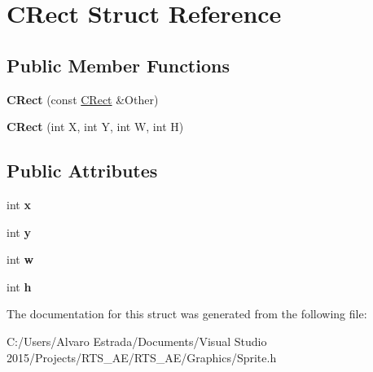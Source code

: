 \hypertarget{struct_c_rect}{}\section{C\+Rect Struct Reference}
\label{struct_c_rect}
\subsection*{Public Member Functions}
\begin{DoxyCompactItemize}
\item 
{\bfseries C\+Rect} (const \hyperlink{struct_c_rect}{C\+Rect} \&Other)\hypertarget{struct_c_rect_a2f90aef7942aacd08a7a343e3bd5cb64}{}\label{struct_c_rect_a2f90aef7942aacd08a7a343e3bd5cb64}

\item 
{\bfseries C\+Rect} (int X, int Y, int W, int H)\hypertarget{struct_c_rect_a3fec3a124207abce6b6256227a32d8a2}{}\label{struct_c_rect_a3fec3a124207abce6b6256227a32d8a2}

\end{DoxyCompactItemize}
\subsection*{Public Attributes}
\begin{DoxyCompactItemize}
\item 
int {\bfseries x}\hypertarget{struct_c_rect_af3355e92ecfaef5286d3a03a49c30fd8}{}\label{struct_c_rect_af3355e92ecfaef5286d3a03a49c30fd8}

\item 
int {\bfseries y}\hypertarget{struct_c_rect_ab0571ad5e50e38b2076e68a1b367568c}{}\label{struct_c_rect_ab0571ad5e50e38b2076e68a1b367568c}

\item 
int {\bfseries w}\hypertarget{struct_c_rect_a1e2062b7481c7508ed534910c4138034}{}\label{struct_c_rect_a1e2062b7481c7508ed534910c4138034}

\item 
int {\bfseries h}\hypertarget{struct_c_rect_aff7afec1f0a10ca77fbdff9665c6616c}{}\label{struct_c_rect_aff7afec1f0a10ca77fbdff9665c6616c}

\end{DoxyCompactItemize}


The documentation for this struct was generated from the following file\+:\begin{DoxyCompactItemize}
\item 
C\+:/\+Users/\+Alvaro Estrada/\+Documents/\+Visual Studio 2015/\+Projects/\+R\+T\+S\+\_\+\+A\+E/\+R\+T\+S\+\_\+\+A\+E/\+Graphics/Sprite.\+h\end{DoxyCompactItemize}
